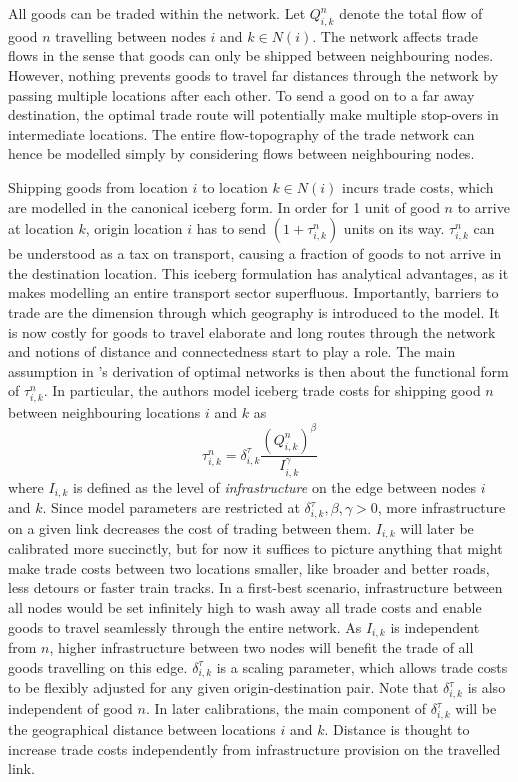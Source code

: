 \documentclass[11pt, oneside]{article}   	%
\begin{document}
All goods can be traded within the network. Let $Q_{i,k}^{n}$ denote the total flow of good $n$ travelling between nodes $i$ and $k \in N(i)$. The network affects trade flows in the sense that goods can only be shipped between neighbouring nodes. However, nothing prevents goods to travel far distances through the network by passing multiple locations after each other. To send a good on to a far away destination, the optimal trade route will potentially make multiple stop-overs in intermediate locations. The entire flow-topography of the trade network can hence be modelled simply by considering flows between neighbouring nodes.

Shipping goods from location $i$ to location $k \in N(i)$ incurs trade costs, which are modelled in the canonical iceberg form. In order for 1 unit of good $n$ to arrive at location $k$, origin location $i$ has to send $(1+\tau_{i,k}^{n})$ units on its way. $\tau_{i,k}^{n}$ can be understood as a tax on transport, causing a fraction of goods to not arrive in the destination location. This iceberg formulation has analytical advantages, as it makes modelling an entire transport sector superfluous. Importantly, barriers to trade are the dimension through which geography is introduced to the model. It is now costly for goods to travel elaborate and long routes through the network and notions of distance and connectedness start to play a role. The main assumption in \citeauthor{fajgelbaum_optimal_2017}'s derivation of optimal networks is then about the functional form of $\tau_{i,k}^{n}$. In particular, the authors model iceberg trade costs for shipping good $n$ between neighbouring locations $i$ and $k$ as
\begin{equation}
  \tau_{i,k}^{n} = \delta^{\tau}_{i,k} \frac{(Q_{i,k}^{n})^{\beta}}{I_{i,k}^{\gamma}}
  \label{eq:tau}
\end{equation}
where $I_{i,k}$ is defined as the level of \emph{infrastructure} on the edge between nodes $i$ and $k$. Since model parameters are restricted at $\delta^{\tau}_{i,k}, \beta, \gamma >0$, more infrastructure on a given link decreases the cost of trading between them. $I_{i,k}$ will later be calibrated more succinctly, but for now it suffices to picture anything that might make trade costs between two locations smaller, like broader and better roads, less detours or faster train tracks. In a first-best scenario, infrastructure between all nodes would be set infinitely high to wash away all trade costs and enable goods to travel seamlessly through the entire network. As $I_{i,k}$ is independent from $n$, higher infrastructure between two nodes will benefit the trade of all goods travelling on this edge. $\delta^{\tau}_{i,k}$ is a scaling parameter, which allows trade costs to be flexibly adjusted for any given origin-destination pair. Note that $\delta^{\tau}_{i,k}$ is also  independent of good $n$. In later calibrations, the main component of $\delta^{\tau}_{i,k}$ will be the geographical distance between locations $i$ and $k$. Distance is thought to increase trade costs independently from infrastructure provision on the travelled link.
\end{document}
